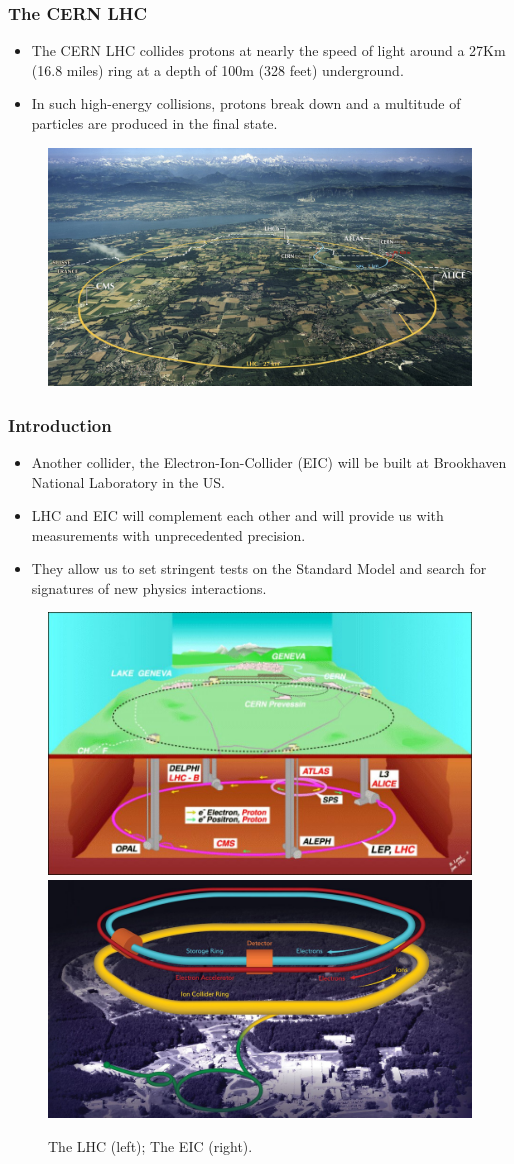 \documentclass{beamer}
\begin{document}
\begin{frame}
  \frametitle{The CERN LHC}

  \begin{itemize}
  \item The CERN LHC collides protons 
  at nearly the speed of light around a 27Km (16.8 miles) ring at a depth of 100m (328 feet) underground.
  \item In such high-energy collisions, protons break down and a multitude of particles are produced in the final state.
  \end{itemize}

  \begin{figure}
    \centering
    \includegraphics[width=0.7\linewidth]{./gfx/lhc-map.jpg}
  \end{figure}
\end{frame}


\begin{frame}
  \frametitle{Introduction}

  \begin{itemize}
  \item Another collider, the Electron-Ion-Collider (EIC) will be built at Brookhaven National Laboratory in the US.
  \item  LHC and EIC will complement each other and will provide us with measurements with unprecedented precision.
  \item They allow us to set stringent tests on the Standard Model and search for signatures of new physics interactions.
  \end{itemize}


  \begin{figure}
    \centering
    \includegraphics[width=0.44\linewidth]{./gfx/leplhc.jpg}
    \includegraphics[width=0.44\linewidth]{./gfx/eic.jpg}
    \caption{The LHC (left); The EIC (right).}
  \end{figure}
\end{frame}
\end{document}
